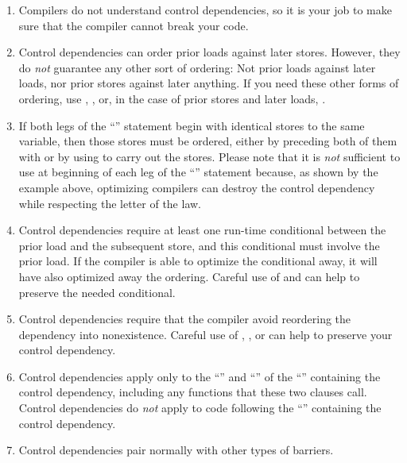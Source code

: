 \begin{enumerate}
\begin{enumerate}
\item	Compilers do not understand control dependencies, so it is
	your job to make sure that the compiler cannot break your code.

\item	Control dependencies can order prior loads against later stores.
	However, they do \emph{not} guarantee any other sort of ordering:
	Not prior loads against later loads, nor prior stores against
	later anything.
	If you need these other forms of ordering, use ,
	, or, in the case of prior stores and later loads,
	.

\item	If both legs of the ``'' statement begin with identical stores
	to the same variable, then those stores must be ordered,
	either by preceding both of them with  or by using
	 to carry out the stores.
	Please note that it is \emph{not} sufficient to use 
	at beginning of each leg of the ``'' statement because, as shown
	by the example above, optimizing compilers can destroy the control
	dependency while respecting the letter of the  law.

\item	Control dependencies require at least one run-time conditional
	between the prior load and the subsequent store, and this
	conditional must involve the prior load.
	If the compiler is able to optimize the conditional away, it
	will have also optimized away the ordering.
	Careful use of  and  can help
	to preserve the needed conditional.

\item	Control dependencies require that the compiler avoid reordering
	the dependency into nonexistence.
	Careful use of , , or
	 can help to preserve your control
	dependency.

\item	Control dependencies apply only to the ``'' and
	``'' of the ``'' containing the control
	dependency, including any functions that these two clauses call.
	Control dependencies do \emph{not} apply to code following the
	``'' containing the control dependency.

\item	Control dependencies pair normally with other types of barriers.


\end{enumerate}
\end{enumerate}
